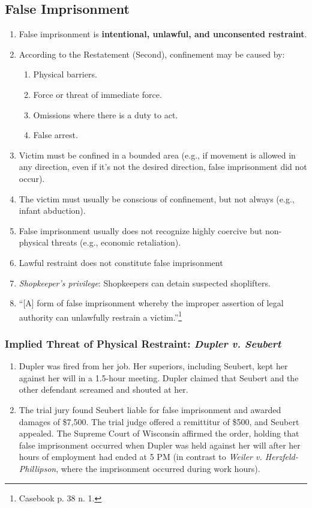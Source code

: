 \subsection{False Imprisonment}

\begin{enumerate}
    \item False imprisonment is \textbf{intentional, unlawful, and unconsented 
    restraint}.
    \item According to the Restatement (Second), confinement may be caused by:
    \begin{enumerate}
        \item Physical barriers.
        \item Force or threat of immediate force.
        \item Omissions where there is a duty to act.
        \item False arrest.
    \end{enumerate}
    \item Victim must be confined in a bounded area (e.g., if movement is 
    allowed in any direction, even if it's not the desired direction, false 
    imprisonment did not occur).
    \item The victim must usually be conscious of confinement, but not always 
    (e.g., infant abduction).
    \item False imprisonment usually does not recognize highly coercive but 
    non-physical threats (e.g., economic retaliation).
    \item Lawful restraint does not constitute false imprisonment
    \item \emph{Shopkeeper's privilege}: Shopkeepers can detain suspected 
    shoplifters.
    \item ``[A] form of false imprisonment whereby the improper assertion of 
    legal authority can unlawfully restrain a victim.''\footnote{Casebook p.  
    38 n. 1.}
\end{enumerate}

\subsubsection{Implied Threat of Physical Restraint: \emph{Dupler v. Seubert}}

\begin{enumerate}
    \item Dupler was fired from her job. Her superiors, including Seubert, 
    kept her against her will in a 1.5-hour meeting. Dupler claimed that 
    Seubert and the other defendant screamed and shouted at her.
    \item The trial jury found Seubert liable for false imprisonment and 
    awarded damages of \$7,500. The trial judge offered a remittitur of \$500, 
    and Seubert appealed. The Supreme Court of Wisconsin affirmed the order, 
    holding that false imprisonment occurred when Dupler was held against her 
    will after her hours of employment had ended at 5 PM (in contrast to 
    \emph{Weiler v. Herzfeld-Phillipson}, where the imprisonment occurred 
    during work hours).
\end{enumerate}

